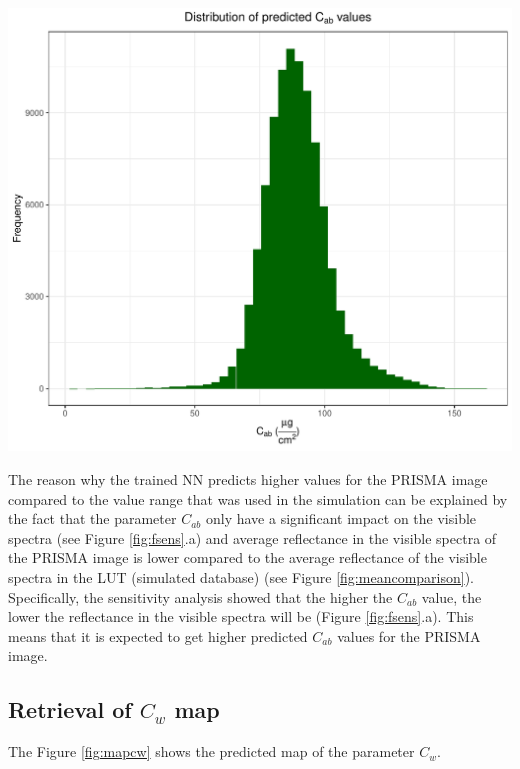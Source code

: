 \documentclass[a4paper, twoside]{templates/ociamthesis}
\let\origfigure\figure
\let\endorigfigure\endfigure
\renewenvironment{figure}[1][2] {
    \expandafter\origfigure\expandafter[H]
} {
    \endorigfigure
}
\begin{document}
\begin{figure}
\includegraphics[width=0.8\linewidth]{./figures/cab_hist} \caption{Distribution of the predicted values for the parameter $C_{ab}$}\label{fig:histcab}
\end{figure}

The reason why the trained NN predicts higher values for the PRISMA image compared to the value range that was used in the simulation can be explained by the fact that the parameter \(C_{ab}\) only have a significant impact on the visible spectra (see Figure \ref{fig:fsens}.a) and average reflectance in the visible spectra of the PRISMA image is lower compared to the average reflectance of the visible spectra in the LUT (simulated database) (see Figure \ref{fig:meancomparison}). Specifically, the sensitivity analysis showed that the higher the \(C_{ab}\) value, the lower the reflectance in the visible spectra will be (Figure \ref{fig:fsens}.a). This means that it is expected to get higher predicted \(C_{ab}\) values for the PRISMA image.

\hypertarget{retrieval-of-c_w-map}{%
\subsection{\texorpdfstring{Retrieval of \(C_{w}\) map}{Retrieval of C\_\{w\} map}}\label{retrieval-of-c_w-map}}

The Figure \ref{fig:mapcw} shows the predicted map of the parameter \(C_{w}\).
\end{document}
